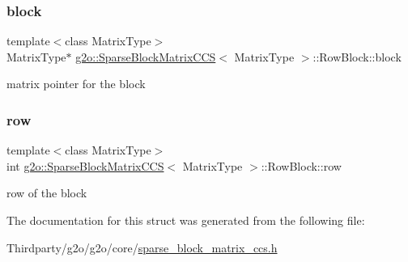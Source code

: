 \subsubsection{\texorpdfstring{block}{block}}
{\footnotesize\ttfamily template$<$class Matrix\+Type$>$ \\
Matrix\+Type$\ast$ \mbox{\hyperlink{classg2o_1_1_sparse_block_matrix_c_c_s}{g2o\+::\+Sparse\+Block\+Matrix\+C\+CS}}$<$ Matrix\+Type $>$\+::Row\+Block\+::block}



matrix pointer for the block 

\mbox{\label{structg2o_1_1_sparse_block_matrix_c_c_s_1_1_row_block_af414f235d5aa28ca1508cfa0860c4949}} 
\subsubsection{\texorpdfstring{row}{row}}
{\footnotesize\ttfamily template$<$class Matrix\+Type$>$ \\
int \mbox{\hyperlink{classg2o_1_1_sparse_block_matrix_c_c_s}{g2o\+::\+Sparse\+Block\+Matrix\+C\+CS}}$<$ Matrix\+Type $>$\+::Row\+Block\+::row}



row of the block 



The documentation for this struct was generated from the following file\+:\begin{DoxyCompactItemize}
\item 
Thirdparty/g2o/g2o/core/\mbox{\hyperlink{sparse__block__matrix__ccs_8h}{sparse\+\_\+block\+\_\+matrix\+\_\+ccs.\+h}}\end{DoxyCompactItemize}
